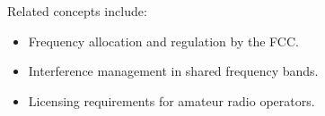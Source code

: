 Related concepts include:
\begin{itemize}
    \item Frequency allocation and regulation by the FCC.
    \item Interference management in shared frequency bands.
    \item Licensing requirements for amateur radio operators.
\end{itemize}

